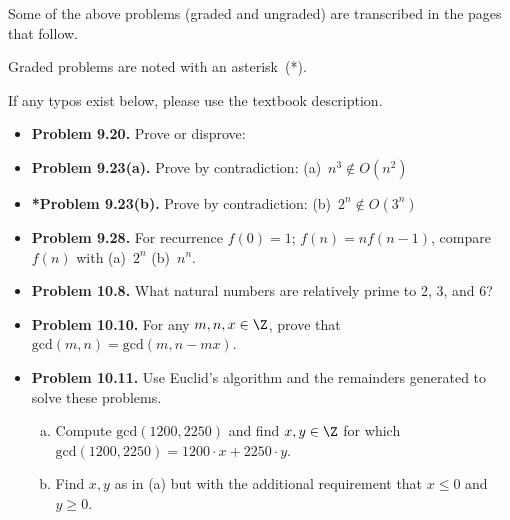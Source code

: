 \documentclass[11pt]{article}
\begin{document}
Some of the above problems (graded and ungraded)
are transcribed in the pages that follow.

Graded problems are noted with an asterisk~(*).

If any typos exist below, please use the textbook description.

\newpage
\begin{itemize}

\item \textbf{Problem 9.20.}
Prove or disprove:
\begin{enumerate}[(a)]
\end{enumerate}

\vspace{0.1in}

\item \textbf{Problem 9.23(a).}
Prove by contradiction: (a)~$n^3\not\in O(n^2)$

\vspace{0.1in}

\item \textbf{*Problem 9.23(b).}
Prove by contradiction: (b)~$2^n\not\in O(3^n)$

\vspace{0.1in}

\item \textbf{Problem 9.28.}
For recurrence $f(0)=1$; $f(n)=nf(n-1)$, compare $f(n)$ with (a)~$2^n$ (b)~$n^n$.

\vspace{0.1in}

\item \textbf{Problem 10.8.}
What natural numbers are relatively prime to 2, 3, and 6?

\vspace{0.1in}

\item \textbf{Problem 10.10.}
For any $m,n,x\in\Z$, prove that $\text{gcd}(m,n)=\text{gcd}(m,n-mx)$.

\vspace{0.1in}

\item \textbf{Problem 10.11.}
Use Euclid's algorithm and the remainders generated to solve these problems.
\begin{enumerate}[(a)]
\item Compute $\text{gcd}(1200,2250)$ and find $x,y\in\Z$
  for which $\text{gcd}(1200,2250)=1200\cdot x+2250\cdot y$.
\item Find $x,y$ as in (a) but with the additional requirement that $x\le 0$ and $y\ge 0$.
\end{enumerate}


\end{itemize}
\end{document}
